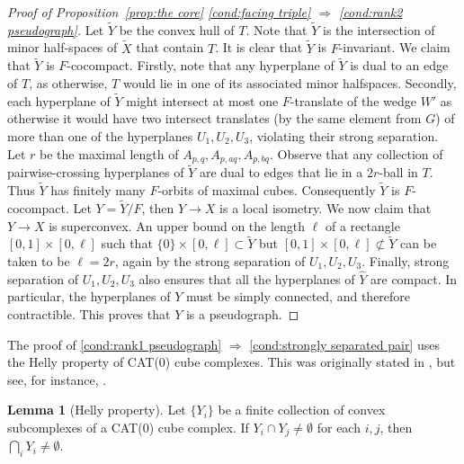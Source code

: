 \documentclass[12pt,oneside]{amsart}
\theoremstyle{definition}
\newtheorem{lem}[thm]{Lemma}
\theoremstyle{definition}
\theoremstyle{remark}
\begin{document}
\begin{proof}[Proof of Proposition~\ref{prop:the core} \eqref{cond:facing triple} $\Rightarrow$ \eqref{cond:rank2 pseudograph}]
Let $\widetilde Y$ be the convex hull of $T$.
Note that $\widetilde Y$ is the intersection of minor half-spaces of $\widetilde X$ that contain $T$.
It is clear that $\widetilde Y$ is $F$-invariant.
We claim that $\widetilde Y$ is $F$-cocompact.
Firstly, note that any hyperplane of $\widetilde Y$ is dual to an edge of $T$,
as otherwise, $T$ would lie in one of its associated minor halfspaces.
Secondly, each hyperplane of $\widetilde Y$ might intersect at most one $F$-translate of the wedge $W'$ as otherwise it would have two intersect translates (by the same element from $G$) of more than one of the hyperplanes $U_1, U_2, U_3$, violating their strong separation.
Let $r$ be the maximal length of $A_{p,q}, A_{p,aq}, A_{p,bq}$.
Observe that any collection of pairwise-crossing hyperplanes of $\widetilde Y$
are dual to edges that lie in a $2r$-ball in $T$.
Thus $\widetilde Y$ has finitely many $F$-orbits of maximal cubes. Consequently $\widetilde Y$ is $F$-cocompact. Let $Y = \widetilde Y/F$, then $Y\to X$ is a local isometry.
We now claim that $Y\to X$ is superconvex. An upper bound on the length $\ell$ of a rectangle $[0,1]\times[0,\ell]$ such that $\{0\}\times [0,\ell]\subset \widetilde Y$ but $[0,1]\times[0,\ell]\not\subset \widetilde Y$ can be taken to be $\ell = 2r$, again by the strong separation of $U_1, U_2, U_3$.
Finally, strong separation of $U_1, U_2, U_3$ also ensures that all the hyperplanes of $\widehat Y$ are compact. In particular, the hyperplanes of $Y$ must be simply connected, and therefore contractible. This proves that $Y$ is a pseudograph.
\end{proof}


The  proof of   \eqref{cond:rank1 pseudograph} $\Rightarrow$ \eqref{cond:strongly separated pair} uses the Helly property of CAT(0) cube complexes. 
This was originally stated in \cite{Gerasimov98},
 but see, for instance, \cite[Lem~2.10]{WiseBook}.
\begin{lem}[Helly property]\label{lem:helly}
Let $\{Y_i\}$ be a finite collection of convex subcomplexes of a CAT(0) cube complex. If $Y_i\cap Y_j\neq \emptyset$ for each $i,j$, then $\bigcap_i Y_i \neq \emptyset$.
\end{lem}
\end{document}
